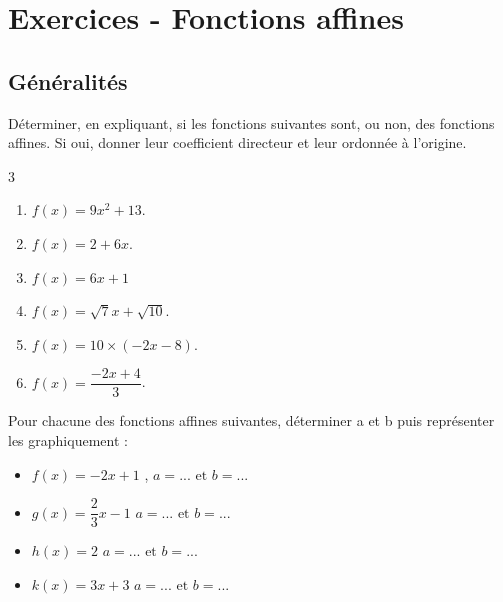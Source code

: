 \section*{Exercices - Fonctions affines}
{\setlength{\columnseprule}{0pt}
\setcounter{NumEx}{1}

\subsection*{Généralités}


\begin{Exercice} %
Déterminer, en expliquant, si les fonctions suivantes sont, ou non, des fonctions affines. Si oui, donner leur coefficient directeur et leur ordonnée à l'origine.
\vspace{-0.5cm}
\begin{multicols}{3}
\begin{enumerate}

\item $f(x)=9x^{2}+13 $.
\item $f(x)=2 +6  x$.
\item $f(x)=6x+1$
\item $f(x)=\sqrt{7}x + \sqrt{10}$.
\item $f(x)=10\times (-2x-8) $.
\item $f(x)=\dfrac{-2x+4}{3}$.
\end{enumerate}
\end{multicols}
\end{Exercice}



\begin{Exercice} %
\begin{minipage}[c]{0.5\linewidth}
   Pour chacune des fonctions affines suivantes, déterminer a et b puis représenter les graphiquement :
      \begin{itemize}[label=\textcolor{Couleur6}{$\bullet$}]
       \item $f(x)=-2x+1$ , $ a=...\text{ et } b=... $
         \item $g(x)=\dfrac{2}{3}x-1$ $ a=...\text{ et } b=... $
         \item $h(x)=2$ $ a=...\text{ et } b=... $
         \item $k(x)=3x+3$ $ a=...\text{ et } b=... $
      \end{itemize}
\end{minipage} \hfill
\begin{minipage}[c]{0.5\linewidth}
\begin{center}
\end{center}
\end{minipage}
\end{Exercice}}
